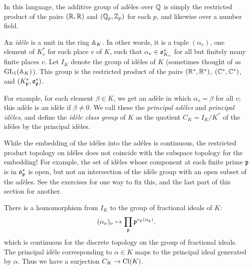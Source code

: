 In this language, the additive group of ad\`eles over $\QQ$
is simply the restricted
product of the pairs $(\RR, \RR)$ and $(\QQ_p, \ZZ_p)$ for each $p$,
and likewise over a number field.


An \emph{id\`ele} is a unit in the ring $\AA_K$. In other words, it is a
tuple $(\alpha_v)$, one element of $K_v^*$ for each place $v$ of $K$, such that
$\alpha_v \in \gotho_{K_v}^*$ for all but finitely many finite places $v$.
Let $I_K$ denote the group of id\`eles of $K$ (sometimes thought
of as $\GL_1(\AA_K)$). This group is the restricted product of the pairs
$(\RR^*, \RR^*)$, $(\CC^*, \CC^*)$, and $(K_{\gothp}^*, \gotho_{\gothp}^*)$.

For example, for each element $\beta \in K$, we get an ad\`ele
in which $\alpha_v = \beta$ for all $v$; this ad\`ele is an id\`ele if $\beta \neq 0$. We
call these the \emph{principal ad\`eles} and \emph{principal id\`eles},
and define the \emph{id\`ele class group} of $K$ as the quotient
$C_K = I_K/K^*$ of the id\`eles by the principal id\`eles.

  While the embedding of the id\'eles into the ad\'eles is continuous,
the restricted product topology on id\'eles does not coincide with the subspace topology for the embedding!
For
example, the set of id\`eles whose component at each finite prime $\gothp$ is in $\gotho_{\gothp}^*$ 
is open, but not an
intersection of the id\`ele group with an open subset of the ad\`eles. See the exercises for one way to fix this, and the last part of this section for another.

\medskip
There is a homomorphism from $I_K$ to the group of fractional ideals
of $K$:
\[
(\alpha_\nu)_\nu \mapsto \prod_{\gothp} \gothp^{v_{\gothp}(\alpha_\gothp)},
\]
which is continuous for the discrete topology on the group of fractional
ideals.
The principal id\`ele corresponding to $\alpha \in K$ maps to the principal
ideal generated by $\alpha$. Thus we have a surjection $C_K \to \Cl(K)$.

